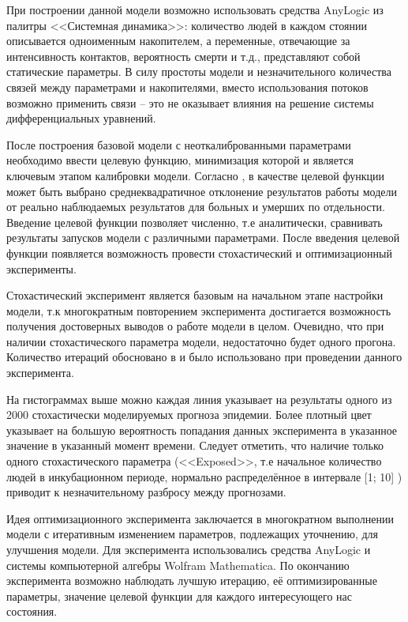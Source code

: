 При построении данной модели возможно использовать средства AnyLogic из палитры <<Системная динамика>>: количество людей в каждом стоянии описывается одноименным накопителем, а переменные, отвечающие за интенсивность контактов, вероятность смерти и т.д., представляют собой статические параметры. В силу простоты модели и незначительного количества связей между параметрами и накопителями, вместо использования потоков возможно применить связи -- это не оказывает влияния на решение системы дифференциальных уравнений. 

После построения базовой модели с неоткалиброванными параметрами необходимо ввести целевую функцию, минимизация которой и является ключевым этапом калибровки модели. Согласно  %
\cite[с. 26]{Bykova:2015}, в качестве  целевой функции может быть выбрано среднеквадратичное отклонение результатов работы модели от  реально наблюдаемых результатов для больных и  умерших  по отдельности. Введение целевой функции позволяет численно, т.е аналитически, сравнивать результаты запусков модели с различными параметрами.
После введения целевой функции появляется возможность провести стохастический и оптимизационный эксперименты.

Стохастический эксперимент является базовым на начальном этапе настройки модели, т.к многократным повторением эксперимента достигается возможность получения достоверных выводов о работе модели в целом. Очевидно, что при наличии стохастического параметра модели, недостаточно будет одного прогона. Количество итераций обосновано в  %
\cite{Kondratiev:2010} и было использовано при проведении данного эксперимента. 


На гистограммах выше можно каждая линия указывает на результаты одного из 2000 стохастически моделируемых прогноза эпидемии.  Более плотный цвет указывает на большую вероятность попадания данных эксперимента в указанное значение в указанный момент времени. Следует отметить, что наличие только одного стохастического параметра (<<Exposed>>, т.е начальное количество людей в инкубационном периоде, нормально распределённое в интервале [1; 10] ) приводит  к незначительному разбросу между прогнозами.

Идея  оптимизационного  эксперимента заключается в многократном выполнении модели с итеративным изменением параметров, подлежащих уточнению, для улучшения модели. Для эксперимента использовались средства AnyLogic  и системы компьютерной алгебры Wolfram Mathematica. По окончанию эксперимента возможно наблюдать лучшую итерацию, её оптимизированные параметры, значение целевой функции для каждого интересующего нас состояния.

